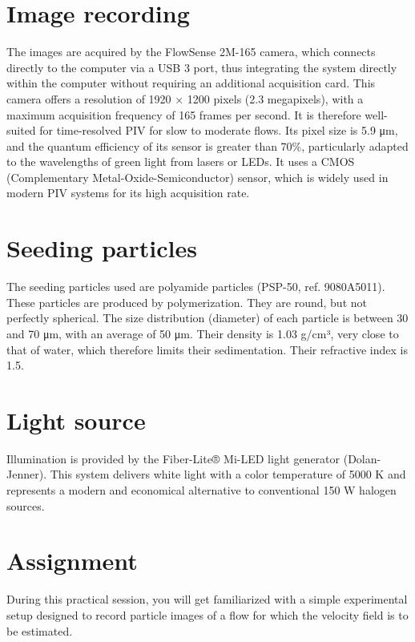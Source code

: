 \documentclass[
  english,
  letterpaper,
  numbers=noendperiod,
  DIV=13]{scrreprt}
\begin{document}
\section{Image recording}\label{image-recording}

The images are acquired by the FlowSense 2M-165 camera, which connects
directly to the computer via a USB 3 port, thus integrating the system
directly within the computer without requiring an additional acquisition
card. This camera offers a resolution of 1920 × 1200 pixels (2.3
megapixels), with a maximum acquisition frequency of 165 frames per
second. It is therefore well-suited for time-resolved PIV for slow to
moderate flows. Its pixel size is 5.9 μm, and the quantum efficiency of
its sensor is greater than 70\%, particularly adapted to the wavelengths
of green light from lasers or LEDs. It uses a CMOS (Complementary
Metal-Oxide-Semiconductor) sensor, which is widely used in modern PIV
systems for its high acquisition rate.

\section{Seeding particles}\label{seeding-particles}

The seeding particles used are polyamide particles (PSP-50, ref.
9080A5011). These particles are produced by polymerization. They are
round, but not perfectly spherical. The size distribution (diameter) of
each particle is between 30 and 70 μm, with an average of 50 μm. Their
density is 1.03 g/cm³, very close to that of water, which therefore
limits their sedimentation. Their refractive index is 1.5.

\section{Light source}\label{light-source}

Illumination is provided by the Fiber-Lite® Mi-LED light generator
(Dolan-Jenner). This system delivers white light with a color
temperature of 5000 K and represents a modern and economical alternative
to conventional 150 W halogen sources.

\section{Assignment}\label{assignment}

During this practical session, you will get familiarized with a simple
experimental setup designed to record particle images of a flow for
which the velocity field is to be estimated.
\end{document}
